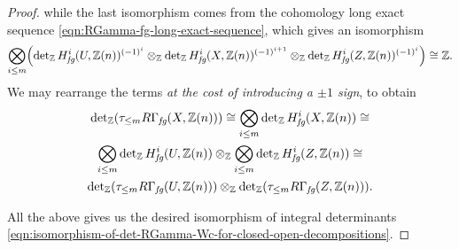 \documentclass{article}
\numberwithin{equation}{section}
\begin{document}
\begin{lemma}
\begin{proof}
    while the last isomorphism comes from the cohomology long exact sequence
    \eqref{eqn:RGamma-fg-long-exact-sequence}, which gives an isomorphism
    \[ \bigotimes_{i \le m}
      \Bigl(\operatorname{det}_{\mathbb{Z}} H^i_{\text{\it fg}} (U, \mathbb{Z}(n))^{(-1)^i} \otimes_{\mathbb{Z}}
      \operatorname{det}_{\mathbb{Z}} H^i_{\text{\it fg}} (X, \mathbb{Z}(n))^{(-1)^{i+1}} \otimes_{\mathbb{Z}}
      \operatorname{det}_{\mathbb{Z}} H^i_{\text{\it fg}} (Z, \mathbb{Z}(n))^{(-1)^i}\Bigr) \cong \mathbb{Z}. \]
    We may rearrange the terms \emph{at the cost of introducing a $\pm 1$ sign},
    to obtain
    \begin{multline*}
      \operatorname{det}_{\mathbb{Z}} (\tau_{\le m} R\Gamma_{\text{\it fg}} (X, \mathbb{Z}(n))) \cong
      \bigotimes_{i \le m} \operatorname{det}_{\mathbb{Z}} H^i_{\text{\it fg}} (X, \mathbb{Z}(n)) \cong \\
      \bigotimes_{i \le m} \operatorname{det}_{\mathbb{Z}} H^i_{\text{\it fg}} (U, \mathbb{Z}(n)) \otimes_{\mathbb{Z}}
      \bigotimes_{i \le m} \operatorname{det}_{\mathbb{Z}} H^i_{\text{\it fg}} (Z, \mathbb{Z}(n)) \cong \\
      \operatorname{det}_{\mathbb{Z}} (\tau_{\le m} R\Gamma_{\text{\it fg}} (U, \mathbb{Z}(n))) \otimes_{\mathbb{Z}}
      \operatorname{det}_{\mathbb{Z}} (\tau_{\le m} R\Gamma_{\text{\it fg}} (Z, \mathbb{Z}(n))).
    \end{multline*}

    All the above gives us the desired isomorphism of integral determinants
    \eqref{eqn:isomorphism-of-det-RGamma-Wc-for-closed-open-decompositions}.


\end{proof}
\end{lemma}
\end{document}
